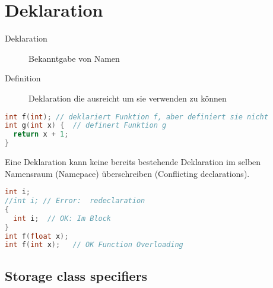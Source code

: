 \section{Deklaration}

\begin{description}
  \item[Deklaration] Bekanntgabe von Namen
  \item[Definition] Deklaration die ausreicht um sie verwenden zu können
\end{description}

\begin{lstlisting}[language=C++]
int f(int); // deklariert Funktion f, aber definiert sie nicht
int g(int x) {  // definert Funktion g
  return x + 1;
}
\end{lstlisting}

Eine Deklaration kann keine bereits bestehende Deklaration im selben Namensraum
(Namepace) überschreiben (Conflicting declarations).

\begin{lstlisting}[language=C++]
int i;
//int i; // Error:  redeclaration
{
  int i;  // OK: Im Block
}
int f(float x);
int f(int x);   // OK Function Overloading
\end{lstlisting}

\subsection{Storage class specifiers}

